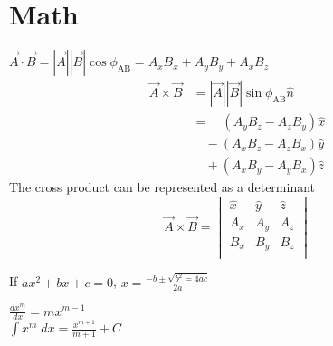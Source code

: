 
\section*{Math}

$\vec{A}\cdot\vec{B} = |\vec{A}||\vec{B}|\cos\phi_{\text{AB}} = A_xB_x + A_yB_y +
A_xB_z$
\begin{align*}
  \vec{A}\times\vec{B} &= |\vec{A}||\vec{B}|\sin\phi_{\text{AB}}\hat{n}\\
  &= \quad(A_yB_z-A_zB_y)\hat{x}\\
  &\quad -(A_xB_z-A_zB_x)\hat{y}\\
  &\quad +(A_xB_y-A_yB_x)\hat{z}
\end{align*}
The cross product can be represented as a determinant
\begin{equation*}
  \vec{A}\times\vec{B} = %
  \begin{vmatrix}
    \hat{x} & \hat{y} & \hat{z}\\
    A_x & A_y & A_z \\
    B_x & B_y & B_z \\
  \end{vmatrix}
\end{equation*}

If $ax^2 + bx +c = 0$, $x=\frac{-b \pm \sqrt{b^2 = 4ac}}{2a}$

$\frac{dx^m}{dx} = mx^{m-1}$\\

$\int x^m\;dx = \frac{x^{m+1}}{m+1} + C$
